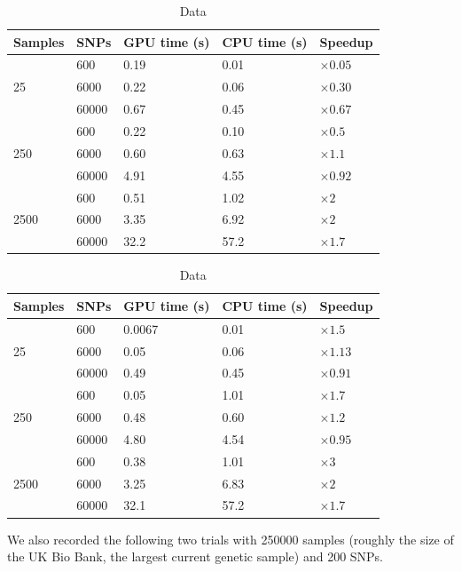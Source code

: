 \documentclass[12pt]{article}
\begin{document}
\begin{table}[ht]
  \caption{Data}
\begin{tabular}{l|lll|l}
Samples & SNPs  & GPU time (s) & CPU time (s) & Speedup       \\
        \hline
        & 600   & 0.19         & 0.01         & $\times 0.05$ \\
25      & 6000  & 0.22         & 0.06         & $\times 0.30$ \\
        & 60000 & 0.67         & 0.45         & $\times 0.67$ \\
        \hline
        & 600   & 0.22         & 0.10         & $\times 0.5$  \\
250     & 6000  & 0.60         & 0.63         & $\times 1.1$  \\
        & 60000 & 4.91         & 4.55         & $\times 0.92$ \\
        \hline
        & 600   & 0.51         & 1.02         & $\times 2$    \\
2500    & 6000  & 3.35         & 6.92         & $\times 2$    \\
        & 60000 & 32.2         & 57.2         & $\times 1.7$
\end{tabular}

\begin{tabular}{l|lll|l}
  Samples & SNPs & GPU time (s) & CPU time (s) & Speedup       \\
\hline
  & 600&0.0067       & 0.01         & $\times 1.5$  \\
  25 & 6000 &0.05         & 0.06         & $\times 1.13$ \\
  & 60000&0.49         & 0.45         & $\times 0.91$ \\
\hline
  & 600&0.05         & 1.01         & $\times 1.7$  \\
  250 & 6000&0.48         & 0.60         & $\times 1.2$  \\
  & 60000 &4.80         & 4.54         & $\times 0.95$ \\
\hline
  & 600&0.38         & 1.01         & $\times 3$    \\
  2500 &6000 &3.25         & 6.83         & $\times 2$    \\
  & 60000&32.1         & 57.2         & $\times 1.7$
\end{tabular}
\end{table}

We also recorded the following two trials with 250000 samples
(roughly the size of the UK Bio Bank, the largest current genetic sample)
and 200 SNPs.
\end{document}
